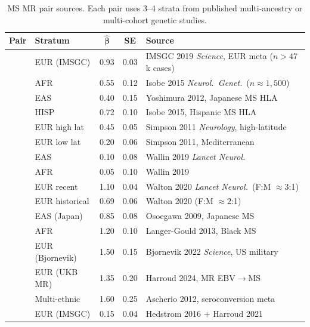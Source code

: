 \documentclass[11pt]{article}
\begin{document}
\begin{table}[h]
\centering
\caption{MS MR pair sources. Each pair uses 3--4 strata from published multi-ancestry or multi-cohort genetic studies.}
\label{tab:mr-sources-ms}
\small
\begin{tabular}{@{}llccp{4.5cm}@{}}
\toprule
\textbf{Pair} & \textbf{Stratum} & $\boldsymbol{\hat\beta}$ & \textbf{SE} & \textbf{Source} \\
\midrule
{}
& EUR (IMSGC) & 0.93 & 0.03 & IMSGC 2019 \emph{Science}, EUR meta ($n > 47$k cases) \\
& AFR & 0.55 & 0.12 & Isobe 2015 \emph{Neurol.\ Genet.}\ ($n \approx 1{,}500$) \\
& EAS & 0.40 & 0.15 & Yoshimura 2012, Japanese MS HLA \\
& HISP & 0.72 & 0.10 & Isobe 2015, Hispanic MS HLA \\
\midrule
{}
& EUR high lat & 0.45 & 0.05 & Simpson 2011 \emph{Neurology}, high-latitude \\
& EUR low lat & 0.20 & 0.06 & Simpson 2011, Mediterranean \\
& EAS & 0.10 & 0.08 & Wallin 2019 \emph{Lancet Neurol.} \\
& AFR & 0.05 & 0.10 & Wallin 2019 \\
\midrule
{}
& EUR recent & 1.10 & 0.04 & Walton 2020 \emph{Lancet Neurol.}\ (F:M $\approx 3$:1) \\
& EUR historical & 0.69 & 0.06 & Walton 2020 (F:M $\approx 2$:1) \\
& EAS (Japan) & 0.85 & 0.08 & Osoegawa 2009, Japanese MS \\
& AFR & 1.20 & 0.10 & Langer-Gould 2013, Black MS \\
\midrule
{}
& EUR (Bjornevik) & 1.50 & 0.15 & Bjornevik 2022 \emph{Science}, US military \\
& EUR (UKB MR) & 1.35 & 0.20 & Harroud 2024, MR EBV$\to$MS \\
& Multi-ethnic & 1.60 & 0.25 & Ascherio 2012, seroconversion meta \\
\midrule
{}
& EUR (IMSGC) & 0.15 & 0.04 & Hedstrom 2016 + Harroud 2021 \\

\end{tabular}
\end{table}
\end{document}
